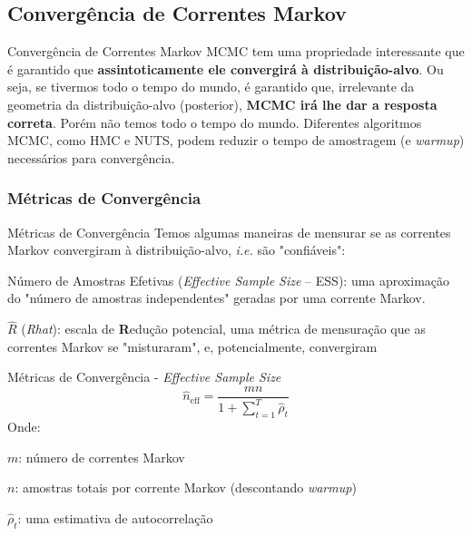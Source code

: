 \subsection{Convergência de Correntes Markov}
\begin{frame}{Convergência de Correntes Markov}
  MCMC tem uma propriedade interessante que é garantido que \textbf{assintoticamente ele convergirá
  à distribuição-alvo}.
  \vfill
  Ou seja, se tivermos todo o tempo do mundo, é garantido que, irrelevante da geometria
  da distribuição-alvo (posterior), \textbf{MCMC irá lhe dar a resposta correta}.
  \vfill
  Porém não temos todo o tempo do mundo. Diferentes algoritmos MCMC, como HMC e NUTS,
  podem reduzir o tempo de amostragem (e \textit{warmup}) necessários para convergência.
\end{frame}

\subsubsection{Métricas de Convergência}
\begin{frame}{Métricas de Convergência}
  Temos algumas maneiras de mensurar se as correntes Markov convergiram à distribuição-alvo,
  \textit{i.e.} são "confiáveis":
  \begin{vfilleditems}
    \item Número de Amostras Efetivas (\textit{Effective Sample Size} -- ESS):
    uma aproximação do "número de amostras independentes" geradas por uma corrente Markov.
    \item $\widehat{R}$ (\textit{Rhat}):
    escala de \textbf{R}edução potencial, uma métrica de mensuração que as correntes
    Markov se "misturaram", e, potencialmente, convergiram
  \end{vfilleditems}
\end{frame}

\begin{frame}{Métricas de Convergência - \textit{Effective Sample Size} \parencite{gelman2013bayesian}}
  $$\widehat{n}_{\text{eff}} = \frac{mn}{1 + \sum_{t=1}^T \widehat{\rho}_t}$$
  Onde:
  \begin{vfilleditems}
    \item $m$: número de correntes Markov
    \item $n$: amostras totais por corrente Markov (descontando \textit{warmup})
    \item $\widehat{\rho}_t$: uma estimativa de autocorrelação
  \end{vfilleditems}
\end{frame}

